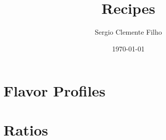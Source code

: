 \documentclass{article}
\title{Recipes}
\author{Sergio Clemente Filho}
\date{\today}
\begin{document}
\maketitle

\newpage

\tableofcontents{}

\newpage

\section{Flavor Profiles}
\section{Ratios}

\newcommand{\chick}[3]{
\subsection{#1}

\paragraph{Ingredients:}

\begin{itemize}
\item #2
\item 1 Chicken Breast 
\item oil
\end{itemize}

\paragraph{Directions:}
\begin{itemize}
\item Cut the chicken and add some lime
\item Let it sit for 10min
\item Wash the chicken with running water
\item (Optional) If you can put all ingredients in a ziplock bag and let it rest for couple of hours.
\item On a sautee pan, add some oil and sear all sides of the chicken.
\item Throw in the remaining ingredients. Lower the heat and let it simmer for 20-30min.
\end{itemize}

\paragraph{Notes:} #3
}
\end{document}
